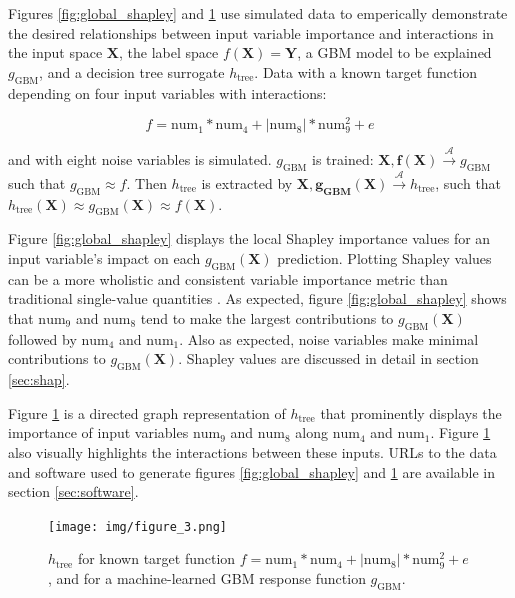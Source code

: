 \documentclass{article}
\begin{document}
Figures \ref{fig:global_shapley} and \ref{fig:dt_surrogate} use simulated data to emperically demonstrate the desired relationships between input variable importance and interactions in the input space $\mathbf{X}$, the label space $f(\mathbf{X}) = \mathbf{Y}$, a GBM model to be explained $g_{\text{GBM}}$, and a decision tree surrogate $h_{\text{tree}}$. Data with a known target function depending on four input variables with interactions: 

\begin{equation}
\label{eq:f}
f = \text{num} _1 * \text{num}_4 + |\text{num}_8| * \text{num}_9^2 + e
\end{equation}

and with eight noise variables is simulated. $g_{\text{GBM}}$ is trained: $ \mathbf{X}, \mathbf{f(X)} \xrightarrow{\mathcal{A}} g_{\text{GBM}}$ such that $g_{\text{GBM}} \approx f$. Then $h_{\text{tree}}$ is extracted by $\mathbf{X}, \mathbf{g_{\text{GBM}}(X)} \xrightarrow{\mathcal{A}} h_{\text{tree}}$, such that $h_{\text{tree}}(\mathbf{X}) \approx g_{\text{GBM}}(\mathbf{X}) \approx f(\mathbf{X})$.

Figure \ref{fig:global_shapley} displays the local Shapley importance values for an input variable's impact on each $g_{\text{GBM}}(\mathbf{X})$ prediction. Plotting Shapley values can be a more wholistic and consistent variable importance metric than traditional single-value quantities \cite{shapley}. As expected, figure \ref{fig:global_shapley} shows that $\text{num}_9$ and $\text{num}_8$ tend to make the largest contributions to $g_{\text{GBM}}(\mathbf{X})$ followed by $\text{num}_4$ and $\text{num}_1$. Also as expected, noise variables make minimal contributions to $g_{\text{GBM}}(\mathbf{X})$. Shapley values are discussed in detail in section \ref{sec:shap}.

Figure \ref{fig:dt_surrogate} is a directed graph representation of $h_{\text{tree}}$ that prominently displays the importance of input variables $\text{num}_9$ and $\text{num}_8$ along $\text{num}_4$ and $\text{num}_1$. Figure \ref{fig:dt_surrogate} also visually highlights the interactions between these inputs. URLs to the data and software used to generate figures \ref{fig:global_shapley} and \ref{fig:dt_surrogate} are available in section \ref{sec:software}.

\begin{figure}[htb]
	\begin{center}
		\texttt{[image: img/figure\_3.png]}
		\caption{$h_{\text{tree}}$ for known target function $f = \text{num} _1 * \text{num}_4 + |\text{num}_8| * \text{num}_9^2 + e$, and for a machine-learned GBM response function $g_{\text{GBM}}$.}
		\label{fig:dt_surrogate}
	\end{center}
\end{figure}
\end{document}
